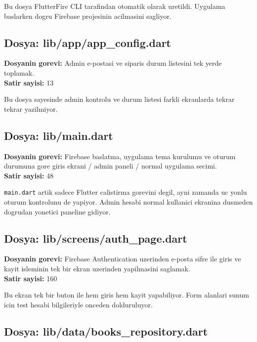 \documentclass[12pt,a4paper]{article}
\begin{document}
Bu dosya FlutterFire CLI tarafindan otomatik olarak uretildi. Uygulama baslarken dogru Firebase projesinin acilmasini sagliyor.

\subsection{Dosya: lib/app/app\_config.dart}

\textbf{Dosyanin gorevi:} Admin e-postasi ve siparis durum listesini tek yerde toplamak.\\
\textbf{Satir sayisi:} 13



Bu dosya sayesinde admin kontrolu ve durum listesi farkli ekranlarda tekrar tekrar yazilmiyor.

\subsection{Dosya: lib/main.dart}

\textbf{Dosyanin gorevi:} Firebase baslatma, uygulama tema kurulumu ve oturum durumuna gore giris ekrani / admin paneli / normal uygulama secimi.\\
\textbf{Satir sayisi:} 48



\verb|main.dart| artik sadece Flutter calistirma gorevini degil, ayni zamanda uc yonlu oturum kontrolunu de yapiyor. Admin hesabi normal kullanici ekranina dusmeden dogrudan yonetici paneline gidiyor.

\subsection{Dosya: lib/screens/auth\_page.dart}

\textbf{Dosyanin gorevi:} Firebase Authentication uzerinden e-posta sifre ile giris ve kayit isleminin tek bir ekran uzerinden yapilmasini saglamak.\\
\textbf{Satir sayisi:} 160



Bu ekran tek bir buton ile hem giris hem kayit yapabiliyor. Form alanlari sunum icin test hesabi bilgileriyle onceden dolduruluyor.

\subsection{Dosya: lib/data/books\_repository.dart}
\end{document}
